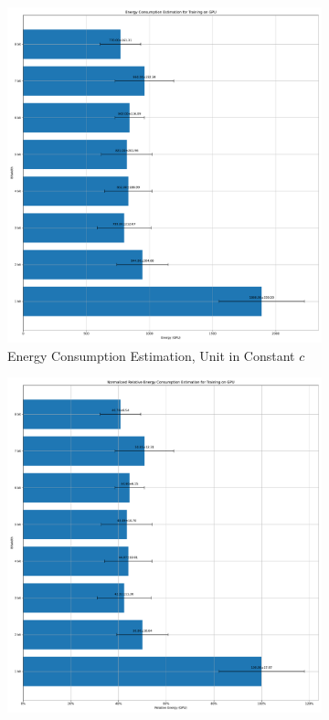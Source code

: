         \begin{figure}[H]
            \centering
            \begin{subfigure}[H]{0.48\textwidth}
                \includegraphics[width=\textwidth]{../standard/FashionMNIST/plots/fashionmnist_train_energy_gpu.pdf}
                \caption{Energy Consumption Estimation, Unit in Constant $c$}
            \end{subfigure}
            \hfill
            \begin{subfigure}[H]{0.48\textwidth}
                \includegraphics[width=\textwidth]{../standard/FashionMNIST/plots/fashionmnist_train_relative_energy_gpu.pdf}

\end{subfigure}
\end{figure}

